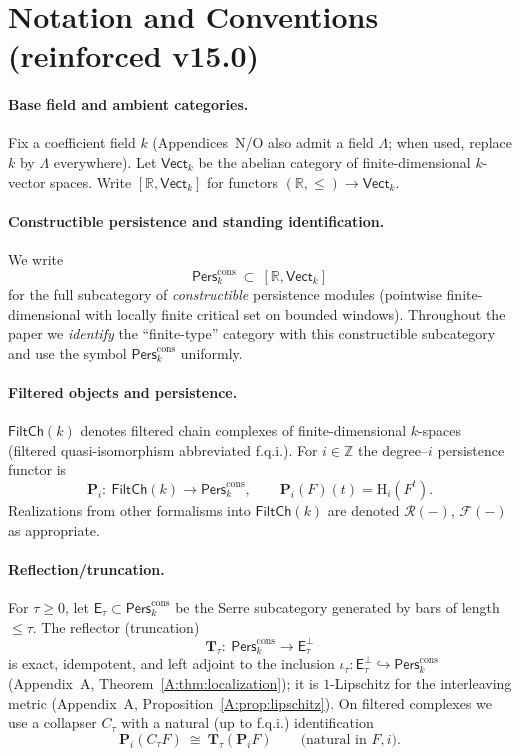 \documentclass[11pt]{article}
\DeclareRobustCommand{\hyp}{\nobreakdash-}
\newcommand{\Pers}{\mathsf{Pers}}
\numberwithin{equation}{section}
\theoremstyle{definition}
\DeclareRobustCommand{\Perskft}{\Pers^{\mathrm{cons}}_{k}}
\begin{document}
\section*{Notation and Conventions (reinforced v15.0)}
{}

\paragraph{Base field and ambient categories.}
Fix a coefficient field \(k\) (Appendices~N/O also admit a field \(\Lambda\); when used, replace \(k\) by \(\Lambda\) everywhere).
Let \(\mathsf{Vect}_k\) be the abelian category of finite\hyp dimensional \(k\)\hyp vector spaces.
Write \([\mathbb{R},\mathsf{Vect}_k]\) for functors \((\mathbb{R},\le)\to \mathsf{Vect}_k\).

\paragraph{Constructible persistence and standing identification.}
We write
\[
\Perskft\ \subset\ [\mathbb{R},\mathsf{Vect}_k]
\]
for the full subcategory of \emph{constructible} persistence modules (pointwise finite\hyp dimensional with locally finite critical set on bounded windows).
Throughout the paper we \emph{identify} the “finite\hyp type” category with this constructible subcategory and use the symbol \(\Perskft\) uniformly.

\paragraph{Filtered objects and persistence.}
\(\mathsf{FiltCh}(k)\) denotes filtered chain complexes of finite\hyp dimensional \(k\)\hyp spaces (filtered quasi\hyp isomorphism abbreviated f.q.i.).
For \(i\in\mathbb{Z}\) the degree–\(i\) persistence functor is
\[
\mathbf{P}_i:\ \mathsf{FiltCh}(k)\longrightarrow \Perskft,\qquad \mathbf{P}_i(F)(t)=\mathrm{H}_i(F^t).
\]
Realizations from other formalisms into \(\mathsf{FiltCh}(k)\) are denoted \(\mathcal{R}(-)\), \(\mathcal{F}(-)\) as appropriate.

\paragraph{Reflection/truncation.}
For \(\tau\ge 0\), let \(\mathsf{E}_\tau\subset\Perskft\) be the Serre subcategory generated by bars of length \(\le \tau\).
The reflector (truncation)
\[
\mathbf{T}_\tau:\ \Perskft\longrightarrow \mathsf{E}_\tau^\perp
\]
is exact, idempotent, and left adjoint to the inclusion \(\iota_\tau:\mathsf{E}_\tau^\perp\hookrightarrow\Perskft\) (Appendix~A, Theorem~\ref{A:thm:localization}); it is \(1\)\hyp Lipschitz for the interleaving metric (Appendix~A, Proposition~\ref{A:prop:lipschitz}). On filtered complexes we use a collapser \(C_\tau\) with a natural (up to f.q.i.) identification
\[
\mathbf{P}_i(C_\tau F)\ \cong\ \mathbf{T}_\tau(\mathbf{P}_iF)\qquad\text{(natural in \(F,i\)).}
\]
\end{document}
